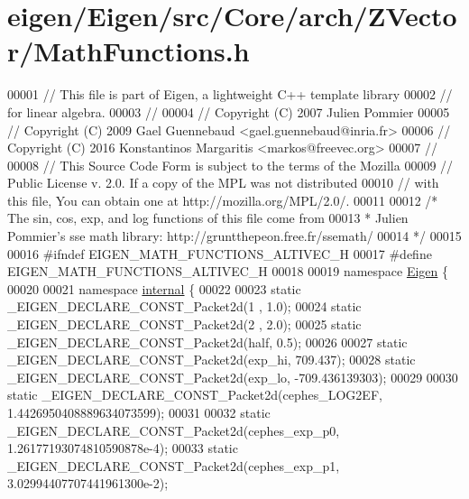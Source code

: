 \hypertarget{eigen_2_eigen_2src_2_core_2arch_2_z_vector_2_math_functions_8h_source}{}\section{eigen/\+Eigen/src/\+Core/arch/\+Z\+Vector/\+Math\+Functions.h}
\label{eigen_2_eigen_2src_2_core_2arch_2_z_vector_2_math_functions_8h_source}

\begin{DoxyCode}
00001 \textcolor{comment}{// This file is part of Eigen, a lightweight C++ template library}
00002 \textcolor{comment}{// for linear algebra.}
00003 \textcolor{comment}{//}
00004 \textcolor{comment}{// Copyright (C) 2007 Julien Pommier}
00005 \textcolor{comment}{// Copyright (C) 2009 Gael Guennebaud <gael.guennebaud@inria.fr>}
00006 \textcolor{comment}{// Copyright (C) 2016 Konstantinos Margaritis <markos@freevec.org>}
00007 \textcolor{comment}{//}
00008 \textcolor{comment}{// This Source Code Form is subject to the terms of the Mozilla}
00009 \textcolor{comment}{// Public License v. 2.0. If a copy of the MPL was not distributed}
00010 \textcolor{comment}{// with this file, You can obtain one at http://mozilla.org/MPL/2.0/.}
00011 
00012 \textcolor{comment}{/* The sin, cos, exp, and log functions of this file come from}
00013 \textcolor{comment}{ * Julien Pommier's sse math library: http://gruntthepeon.free.fr/ssemath/}
00014 \textcolor{comment}{ */}
00015 
00016 \textcolor{preprocessor}{#ifndef EIGEN\_MATH\_FUNCTIONS\_ALTIVEC\_H}
00017 \textcolor{preprocessor}{#define EIGEN\_MATH\_FUNCTIONS\_ALTIVEC\_H}
00018 
00019 \textcolor{keyword}{namespace }\hyperlink{namespace_eigen}{Eigen} \{
00020 
00021 \textcolor{keyword}{namespace }\hyperlink{namespaceinternal}{internal} \{
00022 
00023 \textcolor{keyword}{static} \_EIGEN\_DECLARE\_CONST\_Packet2d(1 , 1.0);
00024 \textcolor{keyword}{static} \_EIGEN\_DECLARE\_CONST\_Packet2d(2 , 2.0);
00025 \textcolor{keyword}{static} \_EIGEN\_DECLARE\_CONST\_Packet2d(half, 0.5);
00026 
00027 \textcolor{keyword}{static} \_EIGEN\_DECLARE\_CONST\_Packet2d(exp\_hi,  709.437);
00028 \textcolor{keyword}{static} \_EIGEN\_DECLARE\_CONST\_Packet2d(exp\_lo, -709.436139303);
00029 
00030 \textcolor{keyword}{static} \_EIGEN\_DECLARE\_CONST\_Packet2d(cephes\_LOG2EF, 1.4426950408889634073599);
00031 
00032 \textcolor{keyword}{static} \_EIGEN\_DECLARE\_CONST\_Packet2d(cephes\_exp\_p0, 1.26177193074810590878e-4);
00033 \textcolor{keyword}{static} \_EIGEN\_DECLARE\_CONST\_Packet2d(cephes\_exp\_p1, 3.02994407707441961300e-2);

\end{DoxyCode}
